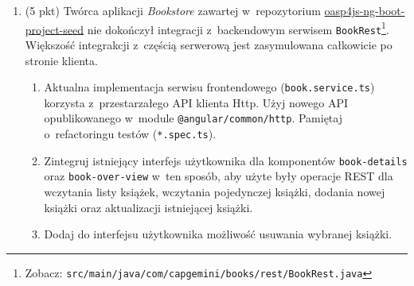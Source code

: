 \documentclass[12pt]{article}
\begin{document}
\begin{enumerate}
        \item\label{exc:backend}
            (5 pkt) Twórca aplikacji \textit{Bookstore} zawartej w~repozytorium \href{https://github.com/pwr-piisw/oasp4js-ng-boot-project-seed}{oasp4js-ng-boot-project-seed} nie dokończył integracji z~backendowym serwisem \texttt{Book\-Rest}\footnote{Zobacz: \texttt{src/main/java/com/capgemini/books/rest/BookRest.java}}. Większość integrakcji z~częścią serwerową jest zasymulowana całkowicie po stronie klienta.
            \begin{enumerate}
                \item Aktualna implementacja serwisu frontendowego (\texttt{book.service.ts}) korzysta z~przestarzałego API klienta Http. Użyj nowego API opublikowanego w~module \texttt{@angular/\-common/\-http}. Pamiętaj o~refactoringu testów (\texttt{*.spec.ts}).
                \item Zintegruj istniejący interfejs użytkownika dla komponentów \texttt{book-\allowbreak de\-tails} oraz \texttt{book-\allowbreak over-\allowbreak view} w~ten sposób, aby użyte były operacje REST dla wczytania listy książek, wczytania pojedynczej książki, dodania nowej książki oraz aktualizacji istniejącej książki.
                \item Dodaj do interfejsu użytkownika możliwość usuwania wybranej książki.
            \end{enumerate}


\end{enumerate}
\end{document}

